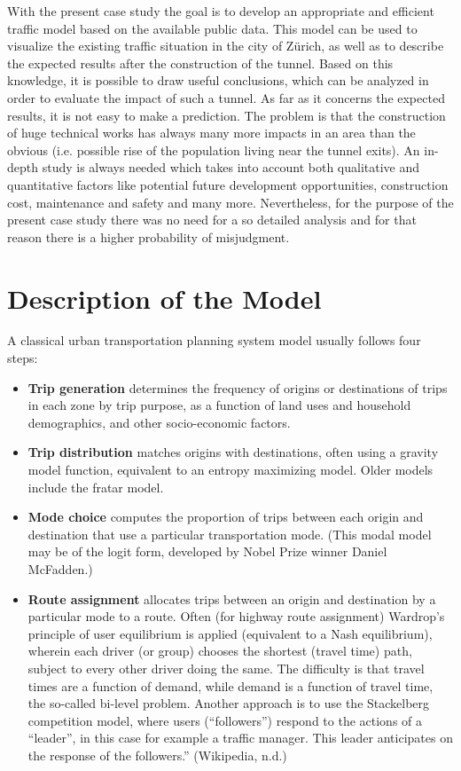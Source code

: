 \documentclass[11pt]{article}
\begin{document}
With the present case study the goal is to develop an appropriate and efficient traffic model based on the available public data. This model can be used to visualize the existing traffic situation in the city of Z\"urich, as well as to describe the expected results after the construction of the tunnel. Based on this knowledge, it is possible to draw useful conclusions, which can be analyzed in order to evaluate the impact of such a tunnel. As far as it concerns the expected results, it is not easy to make a prediction. The problem is that the construction of huge technical works has always many more impacts in an area than the obvious (i.e. possible rise of the population living near the tunnel exits). An in-depth study is always needed which takes into account both qualitative and quantitative factors like potential future development opportunities, construction cost, maintenance and safety and many more. Nevertheless, for the purpose of the present case study there was no need for a so detailed analysis and for that reason there is a higher probability of misjudgment.


\section{Description of the Model}
A classical urban transportation planning system model usually follows four steps:

\begin{itemize}
	\item \textbf{Trip generation} determines the frequency of origins or destinations of trips in each zone by trip purpose, as a function of land uses and household demographics, and other socio-economic factors.

	\item \textbf{Trip distribution} matches origins with destinations, often using a gravity model function, equivalent to an entropy maximizing model. Older models include the fratar model.

	\item \textbf{Mode choice} computes the proportion of trips between each origin and destination that use a particular transportation mode. (This modal model may be of the logit form, developed by Nobel Prize winner Daniel McFadden.)

	\item \textbf{Route assignment} allocates trips between an origin and destination by a particular mode to a route. Often (for highway route assignment) Wardrop's principle of user equilibrium is applied (equivalent to a Nash equilibrium), wherein each driver (or group) chooses the shortest (travel time) path, subject to every other driver doing the same. The difficulty is that travel times are a function of demand, while demand is a function of travel time, the so-called bi-level problem. Another approach is to use the Stackelberg competition model, where users (``followers'') respond to the actions of a ``leader'', in this case for example a traffic manager. This leader anticipates on the response of the followers.”  (Wikipedia, n.d.)
\end{itemize}
\end{document}
